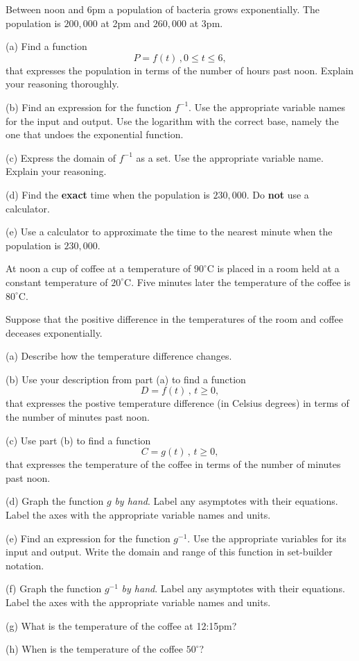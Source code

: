 \documentclass{ximera}
\begin{document}
\begin{question} \label{Q7:LogF}
Between noon and 6pm a population of bacteria grows exponentially. The population is $200,000$ at 2pm and $260,000$ at 3pm.

(a) Find a function 
\[
     P = f(t) \, , 0\leq t \leq 6 ,
\]
that expresses the population in terms of the number of hours past noon. Explain your reasoning thoroughly.

(b) Find an expression for the function $f^{-1}$. Use the appropriate variable names for the input and output. Use the logarithm with the correct base, namely the one that undoes the exponential function.

(c) Express the domain of $f^{-1}$ as a set. Use the appropriate variable name. Explain your reasoning.

(d) Find the {\bf exact} time when the population is $230,000$. Do {\bf not} use a calculator.

(e) Use a calculator to approximate the time to the nearest minute when the population is $230,000$.

\end{question}

\begin{question}  \label{Q:LKKDBBDEvc}
At noon a cup of coffee at a temperature of $90^\circ$C is placed in a room held at a constant temperature of $20^\circ$C. Five minutes later the temperature of the coffee is $80^\circ$C.

Suppose that the positive difference in the temperatures of the room and coffee deceases exponentially.

(a) Describe how the temperature difference changes.

(b) Use  your description from part (a) to find a function
\[
   D = f(t) \, , \, t \geq 0,
\]
that expresses the postive temperature difference (in Celsius degrees) in terms of the number of minutes past noon.

(c) Use part (b) to find a function
\[
         C = g(t) \, , \, t \geq 0,
\]
that expresses the temperature of the coffee in terms of the number of minutes past noon.

(d) Graph the function $g$ \emph{by hand}. Label any asymptotes with their equations. Label the axes with the appropriate variable names and units.

(e) Find an expression for the function $g^{-1}$. Use the appropriate variables for its input and output. Write the domain and range of this function in set-builder notation.

(f) Graph the function $g^{-1}$ \emph{by hand}. Label any asymptotes with their equations. Label the axes with the appropriate variable names and units.

(g) What is the temperature of the coffee at 12:15pm?

(h) When is the temperature of the coffee $50^\circ$?
\end{question}
\end{document}
